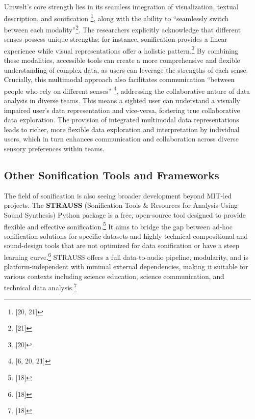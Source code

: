 Umwelt's core strength lies in its seamless integration of visualization, textual description, and sonification \footnote{[20, 21]}, along with the ability to ``seamlessly switch between each modality''\footnote{[21]}. The researchers explicitly acknowledge that different senses possess unique strengths; for instance, sonification provides a linear experience while visual representations offer a holistic pattern.\footnote{[20]} By combining these modalities, accessible tools can create a more comprehensive and flexible understanding of complex data, as users can leverage the strengths of each sense. Crucially, this multimodal approach also facilitates communication ``between people who rely on different senses'' \footnote{[6, 20, 21]}, addressing the collaborative nature of data analysis in diverse teams. This means a sighted user can understand a visually impaired user's data representation and vice-versa, fostering true collaborative data exploration. The provision of integrated multimodal data representations leads to richer, more flexible data exploration and interpretation by individual users, which in turn enhances communication and collaboration across diverse sensory preferences within teams.

\subsection{Other Sonification Tools and Frameworks}
The field of sonification is also seeing broader development beyond MIT-led projects. The \textbf{STRAUSS} (Sonification Tools \& Resources for Analysis Using Sound Synthesis) Python package is a free, open-source tool designed to provide flexible and effective sonification.\footnote{[18]} It aims to bridge the gap between ad-hoc sonification solutions for specific datasets and highly technical compositional and sound-design tools that are not optimized for data sonification or have a steep learning curve.\footnote{[18]} STRAUSS offers a full data-to-audio pipeline, modularity, and is platform-independent with minimal external dependencies, making it suitable for various contexts including science education, science communication, and technical data analysis.\footnote{[18]}

